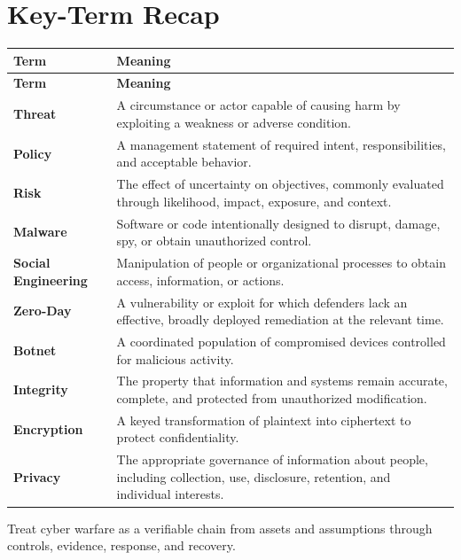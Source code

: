 \documentclass[11pt]{article}
\begin{document}
\section*{Key-Term Recap}
\begin{longtable}{>{\RaggedRight\arraybackslash}p{}>{\RaggedRight\arraybackslash}p{}}
\toprule\rowcolor{Navy}\color{white}\textbf{Term} & \color{white}\textbf{Meaning}\\\midrule
\endfirsthead
\toprule\rowcolor{Navy}\color{white}\textbf{Term} & \color{white}\textbf{Meaning}\\\midrule
\endhead
\textbf{Threat} & A circumstance or actor capable of causing harm by exploiting a weakness or adverse condition. \\\midrule
\textbf{Policy} & A management statement of required intent, responsibilities, and acceptable behavior. \\\midrule
\textbf{Risk} & The effect of uncertainty on objectives, commonly evaluated through likelihood, impact, exposure, and context. \\\midrule
\textbf{Malware} & Software or code intentionally designed to disrupt, damage, spy, or obtain unauthorized control. \\\midrule
\textbf{Social Engineering} & Manipulation of people or organizational processes to obtain access, information, or actions. \\\midrule
\textbf{Zero-Day} & A vulnerability or exploit for which defenders lack an effective, broadly deployed remediation at the relevant time. \\\midrule
\textbf{Botnet} & A coordinated population of compromised devices controlled for malicious activity. \\\midrule
\textbf{Integrity} & The property that information and systems remain accurate, complete, and protected from unauthorized modification. \\\midrule
\textbf{Encryption} & A keyed transformation of plaintext into ciphertext to protect confidentiality. \\\midrule
\textbf{Privacy} & The appropriate governance of information about people, including collection, use, disclosure, retention, and individual interests. \\\midrule
\bottomrule
\end{longtable}
\begin{takeawaybox}
Treat cyber warfare as a verifiable chain from assets and assumptions through controls, evidence, response, and recovery.
\end{takeawaybox}
\end{document}
